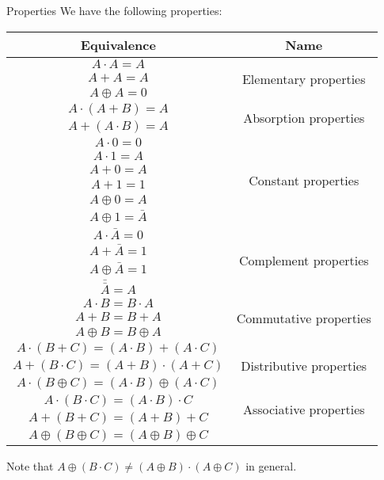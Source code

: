 \documentclass[a4paper]{article}
\begin{document}
\begin{parag}{Properties}
    We have the following properties:
    \begin{center}
        \begin{tabular}{|c|c|}
            \hline
            \textbf{Equivalence} & \textbf{Name} \\
            \hline
            $A \cdot A = A$ & \multirow{3}{*}{Elementary properties} \\
            $A + A = A$ & \\
            $A \oplus A = 0$ & \\
            \hline
            $A \cdot \left(A + B\right) = A$ & \multirow{2}{*}{Absorption properties} \\
            $A + \left(A \cdot B\right) = A$ & \\
            \hline
            $A \cdot 0 = 0$ & \multirow{6}{*}{Constant properties} \\
            $A \cdot 1 = A$ & \\
            $A + 0 = A$ & \\
            $A + 1 = 1$ & \\
            $A \oplus 0 = A$ & \\
            $A \oplus 1 = \bar{A}$ & \\
            \hline
            $A \cdot \bar{A} = 0$ & \multirow{4}{*}{Complement properties} \\
            $A + \bar{A} = 1$ & \\
            $A \oplus \bar{A} = 1$ & \\
            $\bar{\bar{A}} = A$ & \\
            \hline
            $A \cdot B = B \cdot A$ & \multirow{3}{*}{Commutative properties} \\
            $A + B = B + A$ & \\
            $A \oplus B = B \oplus A$ & \\
            \hline
            $A\cdot\left(B + C\right) = \left(A \cdot B\right) + \left(A \cdot C\right)$ & \multirow{3}{*}{Distributive properties} \\
            $A + \left(B \cdot C\right) = \left(A + B\right)\cdot\left(A + C\right)$ & \\
            $A\cdot\left(B \oplus C\right) = \left(A \cdot B\right)\oplus\left(A \cdot C\right)$ & \\
            \hline
            $A \cdot \left(B \cdot C\right) = \left(A \cdot B\right)\cdot C$ & \multirow{2}{*}{Associative properties} \\
            $A + \left(B + C\right) = \left(A + B\right) + C$ & \\
            $A \oplus \left(B \oplus C\right) = \left(A \oplus B\right) \oplus C$ & \\
            \hline
        \end{tabular}
    \end{center}
    
    Note that $A \oplus \left(B \cdot C\right) \neq \left(A \oplus B\right) \cdot \left(A \oplus C\right)$ in general.
\end{parag}
\end{document}
